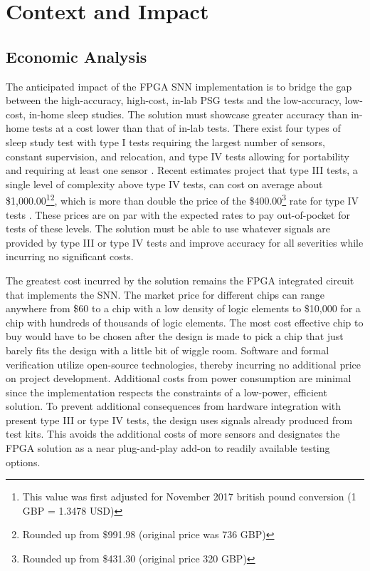 \documentclass[12pt,titlepage]{article}
\begin{document}
\section{Context and Impact}
\subsection{Economic Analysis}
The anticipated impact of the FPGA SNN implementation is to bridge the gap between the high-accuracy, high-cost, in-lab PSG tests and the
low-accuracy, low-cost, in-home sleep studies. The solution must showcase greater accuracy than in-home tests at a cost lower than that of
in-lab tests. There exist four types of sleep study test with type I tests requiring the largest number of sensors, constant supervision,
and relocation, and type IV tests allowing for portability and requiring at least one sensor \cite{elsevier}. Recent estimates project that
type III tests, a single level of complexity above type IV tests, can cost on average about \$1,000.00\footnote[1]{This value was first
adjusted for November 2017 british pound conversion (1 GBP = 1.3478 USD)}\footnote{Rounded up from \$991.98 (original price was 736 GBP)},
which is more than double the price of the \$400.00\footnotemark[1]\footnote{Rounded up from \$431.30 (original price 320 GBP)} rate for
type IV tests \cite{chai}. These prices are on par with the expected rates to pay out-of-pocket for tests of these
levels. The solution must be able to use whatever signals are provided by type III or type IV tests and improve accuracy for all severities
while incurring no significant costs. 

The greatest cost incurred by the solution remains the FPGA integrated circuit that implements the SNN. The market price for different
chips can range anywhere from \$60 to a chip with a low density of logic elements to \$10,000 for a chip with hundreds of thousands of
logic elements. The most cost effective chip to buy would have to be chosen after the design is made to pick a chip that just barely fits
the design with a little bit of wiggle room. Software and formal verification utilize open-source technologies, thereby incurring no
additional price on project development. Additional costs from power consumption are minimal since the implementation respects the
constraints of a low-power, efficient solution. To prevent additional consequences from hardware integration with present type III or
type IV tests, the design uses signals already produced from test kits. This avoids the additional costs of more sensors and designates
the FPGA solution as a near plug-and-play add-on to readily available testing options.
\end{document}
